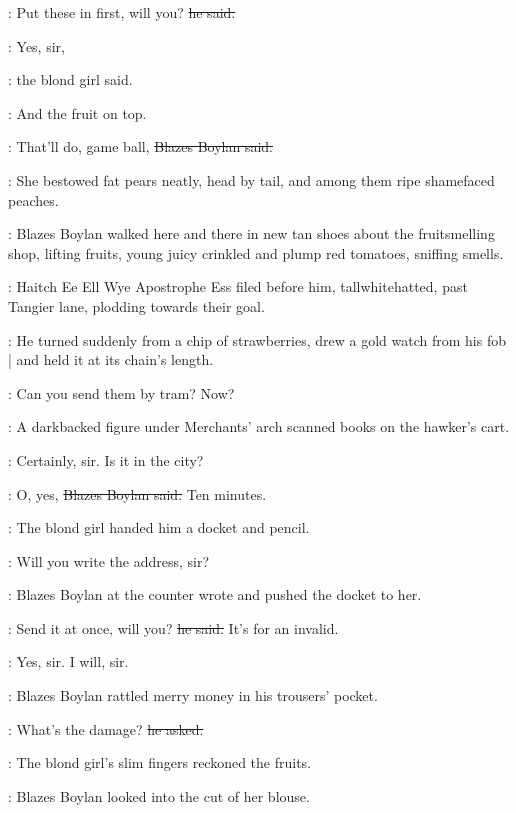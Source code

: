 \boylan:
Put these in first, will you?
\sout{he said.}

\blondgirl:
Yes, sir,

:
the blond girl said.

\blondgirl:
And the fruit on top.

\boylan:
That'll do, game ball,
\sout{Blazes Boylan said.}

:
She bestowed fat pears neatly,
head by tail,
and among them ripe shamefaced peaches.

:
Blazes Boylan walked here and there in new tan shoes
about the fruitsmelling shop,
lifting fruits,
young juicy crinkled and plump red tomatoes,
sniffing smells.

\begin{mdframed}
    :
    Haitch Ee Ell Wye Apostrophe Ess \stage{[H.E.L.Y.'S]}
    filed before him, tallwhitehatted,
    past Tangier lane,
    plodding towards their goal.
\end{mdframed}

:
He turned suddenly from a chip of strawberries,
drew a gold watch from his fob |
and held it at its chain's length.

\boylan:
Can you send them by tram? Now?

\begin{mdframed}
    :
    A darkbacked figure under Merchants' arch
    scanned books on the hawker's cart.
\end{mdframed}

\blondgirl:
Certainly, sir.
Is it in the city?

\boylan:
O, yes,
\sout{Blazes Boylan said.}
Ten minutes.

:
The blond girl handed him a docket and pencil.

\blondgirl:
Will you write the address,
sir?

:
Blazes Boylan at the counter wrote
and pushed the docket to her.

\boylan:
Send it at once, will you?
\sout{he said.}
It's for an invalid.

\blondgirl:
Yes, sir. I will, sir.

:
Blazes Boylan rattled merry money in his trousers' pocket.

\boylan:
What's the damage?
\sout{he asked.}

:
The blond girl's slim fingers reckoned the fruits.

:
Blazes Boylan looked into the cut of her blouse.

